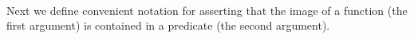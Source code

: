 \begin{code}
\>[0]\AgdaSpace{}%
\AgdaSymbol{:}\AgdaSpace{}%
\AgdaSpace{}%
\AgdaSpace{}%
\AgdaSpace{}%
\AgdaSpace{}%
\AgdaSpace{}%
\AgdaSpace{}%
\AgdaSpace{}%
\AgdaSpace{}%
\AgdaSpace{}%
\AgdaSpace{}%
\AgdaSymbol{(}\AgdaSpace{}%
\AgdaSpace{}%
\AgdaSymbol{)}\<%
\\
\>[0]\AgdaSpace{}%
\AgdaSpace{}%
\AgdaSpace{}%
\AgdaSymbol{=}\AgdaSpace{}%
\AgdaSpace{}%
\AgdaSpace{}%
\AgdaSpace{}%
\AgdaSpace{}%
\AgdaSpace{}%
\AgdaSpace{}%
\AgdaSpace{}%
\AgdaSpace{}%
\AgdaSpace{}%
\<%
\end{code}
\ccpad
Next we define convenient notation for asserting that the image of a function (the first argument) is contained in a predicate (the second argument).
\ccpad
\begin{code}
\>[1]\AgdaSpace{}%
\AgdaSymbol{:}\AgdaSpace{}%
\AgdaSymbol{(}\AgdaSpace{}%
\AgdaSpace{}%
\AgdaSymbol{)}\AgdaSpace{}%
\AgdaSpace{}%
\AgdaSpace{}%
\AgdaSpace{}%
\AgdaSpace{}%
\AgdaSpace{}%
\AgdaSpace{}%
\AgdaSpace{}%
\AgdaSpace{}%
\<%
\\
%
\>[1]\AgdaSpace{}%
\AgdaSpace{}%
\AgdaSpace{}%
\AgdaSpace{}%
\AgdaSymbol{=}\AgdaSpace{}%
\AgdaSpace{}%
\AgdaSpace{}%
\AgdaSpace{}%
\AgdaSpace{}%
\AgdaSpace{}%
\AgdaSpace{}%
\<%
\end{code}
